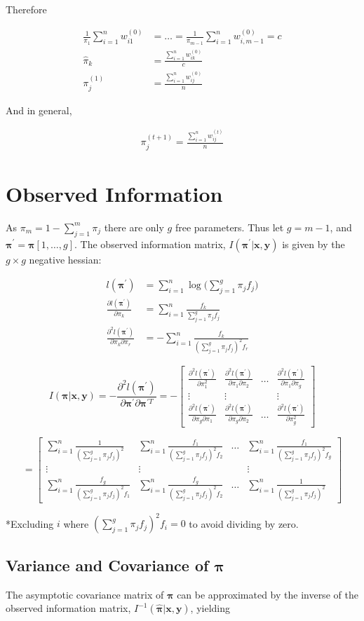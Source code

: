 \documentclass[12pt]{amsart}
\newcommand{\vect}[1]{\boldsymbol{\mathbf{#1}}}
\newcommand{\eqn}[1]{\begin{align*}
#1
\end{align*}}
\newcommand{\mtx}[4]{
\[
#1 = #2
\left[ {\begin{array}{#3}
 #4
 \end{array} } \right]
\]
}
\newcommand{\vx}{\vect{x}}
\newcommand{\vy}{\vect{y}}
\newcommand{\vp}{\vect{\pi}}
\newcommand{\vph}{\hat{\vect{\pi}}}
\newcommand{\fab}{f_j}
\newcommand{\llpp}{l(\vect{\pi^\prime})}
\newcommand{\hessllg}[2]{\sumn \frac{f_{#1}}{(\sumg \pi_j f_j)^2 f_{#2}}}
\newcommand{\hesslld}[2]{\frac{\partial^2 \llpp}{\partial \pi_{#1} \partial \pi_{#2}}}
\newcommand{\sumn}{\sum^n_{i=1}}
\newcommand{\summ}{\sum^m_{j=1}}
\newcommand{\sumg}{\sum^g_{j=1}}
\begin{document}
Therefore


\eqn{
	\frac{1}{\pi_1} \sumn w^{(0)}_{i1} &= \ldots = \frac{1}{\pi_{m-1}} \sumn w^{(0)}_{i,m-1} = c	\\
	\hat{\pi}_k &= \frac{\sumn w^{(0)}_{ik}}{c}		\\
	\pi^{(1)}_j &= \frac{\sumn w^{(0)}_{ij}}{n}
}

And in general,


\eqn{
	\pi^{(t+1)}_j = \frac{\sumn w^{(t)}_{ij}}{n}
}




\clearpage
\section{Observed Information}

As $\pi_m = 1-\summ \pi_j$ there are only $g$ free parameters. Thus let $g=m-1$, and $\vp^\prime=\vp[1,\ldots,g]$. The observed information matrix, $I(\vp^\prime|\vx,\vy)$ is given by the $g\times g$ negative hessian:

\eqn{
	\llpp &= \sumn \log \Big( \sumg \pi_j \fab  \Big)		\\
	\frac{\partial \llpp}{\partial \pi_k} &= \sumn \frac{f_k}{\sumg \pi_j f_j}	\\
	\frac{\partial^2 \llpp}{\partial \pi_k \partial \pi_r} &= -\sumn \frac{f_k}{(\sumg \pi_j f_j)^2 f_r}
}

\mtx{I(\vp|\vx,\vy)=-\frac{\partial^2 \llpp}{\partial \vp^\prime \partial \vp^{\prime T}}}{-}{cccc}{
	\frac{\partial^2 \llpp}{\partial \pi_1^2} & \hesslld{1}{2} & \ldots & \hesslld{1}{g}	\\
	\vdots & \vdots & & \vdots	\\
	\hesslld{g}{1} & \hesslld{g}{2} & \ldots & \frac{\partial^2 \llpp}{\partial \pi_{g}^2}
}

\mtx{}{}{cccc}{
	\sumn \frac{1}{(\sumg \pi_j f_j)^2} & \hessllg{1}{2} & \ldots & \hessllg{1}{g}	\\
	\vdots & \vdots & & \vdots	\\
	\hessllg{g}{1} & \hessllg{g}{2} & \ldots & \sumn \frac{1}{(\sumg \pi_j f_j)^2}
}

*Excluding $i$ where $(\sumg \pi_j f_j)^2 f_{i}=0$ to avoid dividing by zero.

\subsection{Variance and Covariance of $\vp$}
The asymptotic covariance matrix of $\vp$ can be approximated by the inverse of the observed information matrix, $I^{-1}(\vph|\vx,\vy)$, yielding
\end{document}
